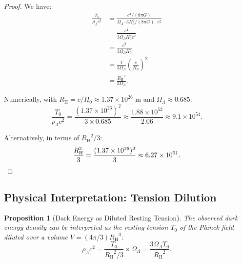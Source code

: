 \documentclass[11pt,a4paper]{article}
\newcommand{\Tzero}{\ensuremath{T_0}}
\newcommand{\RH}{\ensuremath{R_{\mathrm{H}}}}
\newcommand{\OmegaLam}{\ensuremath{\Omega_\Lambda}}
\newtheorem{proposition}[theorem]{Proposition}
\theoremstyle{definition}
\theoremstyle{remark}
\begin{document}
\begin{proof}
We have:
\begin{align}
\frac{\Tzero}{\rho_\Lambda c^2} &= \frac{c^4/(8\pi G)}{\OmegaLam \cdot 3H_0^2/(8\pi G) \cdot c^2} \\
&= \frac{c^4}{3\OmegaLam H_0^2 c^2} \\
&= \frac{c^2}{3\OmegaLam H_0^2} \\
&= \frac{1}{3\OmegaLam}\left(\frac{c}{H_0}\right)^2 \\
&= \frac{\RH^2}{3\OmegaLam}.
\end{align}

Numerically, with $\RH = c/H_0 \approx 1.37 \times 10^{26}$ m and $\OmegaLam \approx 0.685$:
\begin{equation}
\frac{\Tzero}{\rho_\Lambda c^2} = \frac{(1.37 \times 10^{26})^2}{3 \times 0.685} \approx \frac{1.88 \times 10^{52}}{2.06} \approx 9.1 \times 10^{51}.
\end{equation}

Alternatively, in terms of $\RH^2/3$:
\begin{equation}
\frac{\RH^2}{3} = \frac{(1.37 \times 10^{26})^2}{3} \approx 6.27 \times 10^{51}. \qedhere
\end{equation}
\end{proof}

\subsection{Physical Interpretation: Tension Dilution}
\label{sec:tension_dilution}

\begin{proposition}[Dark Energy as Diluted Resting Tension]
\label{prop:diluted_tension}
The observed dark energy density can be interpreted as the resting tension $\Tzero$ of the Planck field diluted over a volume $V = (4\pi/3)\RH^3$:
\begin{equation}
\label{eq:diluted_tension}
\boxed{\rho_\Lambda c^2 = \frac{\Tzero}{\RH^2/3} \times \OmegaLam = \frac{3\OmegaLam \Tzero}{\RH^2}.}
\end{equation}
\end{proposition}
\end{document}
